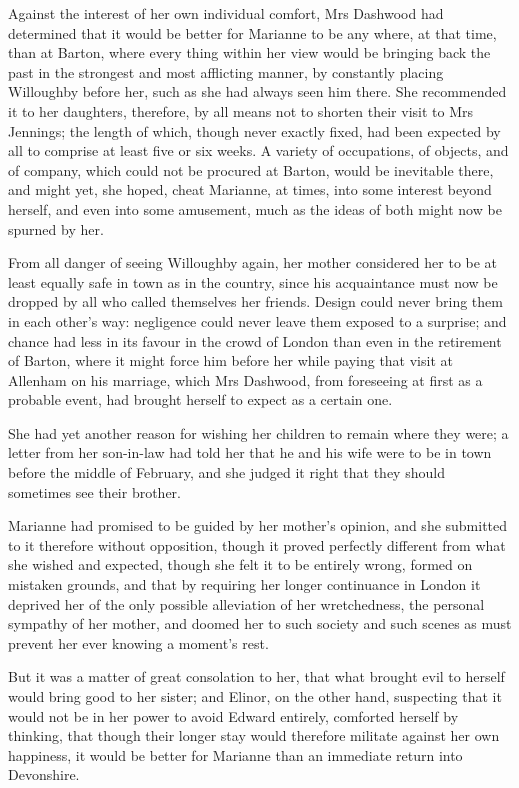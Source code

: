 Against the interest of her own individual comfort, Mrs Dashwood had determined that it would be better for Marianne to be any where, at that time, than at Barton, where every thing within her view would be bringing back the past in the strongest and most afflicting manner, by constantly placing Willoughby before her, such as she had always seen him there. She recommended it to her daughters, therefore, by all means not to shorten their visit to Mrs Jennings; the length of which, though never exactly fixed, had been expected by all to comprise at least five or six weeks. A variety of occupations, of objects, and of company, which could not be procured at Barton, would be inevitable there, and might yet, she hoped, cheat Marianne, at times, into some interest beyond herself, and even into some amusement, much as the ideas of both might now be spurned by her.

From all danger of seeing Willoughby again, her mother considered her to be at least equally safe in town as in the country, since his acquaintance must now be dropped by all who called themselves her friends. Design could never bring them in each other's way: negligence could never leave them exposed to a surprise; and chance had less in its favour in the crowd of London than even in the retirement of Barton, where it might force him before her while paying that visit at Allenham on his marriage, which Mrs Dashwood, from foreseeing at first as a probable event, had brought herself to expect as a certain one.

She had yet another reason for wishing her children to remain where they were; a letter from her son-in-law had told her that he and his wife were to be in town before the middle of February, and she judged it right that they should sometimes see their brother.

Marianne had promised to be guided by her mother's opinion, and she submitted to it therefore without opposition, though it proved perfectly different from what she wished and expected, though she felt it to be entirely wrong, formed on mistaken grounds, and that by requiring her longer continuance in London it deprived her of the only possible alleviation of her wretchedness, the personal sympathy of her mother, and doomed her to such society and such scenes as must prevent her ever knowing a moment's rest.

But it was a matter of great consolation to her, that what brought evil to herself would bring good to her sister; and Elinor, on the other hand, suspecting that it would not be in her power to avoid Edward entirely, comforted herself by thinking, that though their longer stay would therefore militate against her own happiness, it would be better for Marianne than an immediate return into Devonshire.

